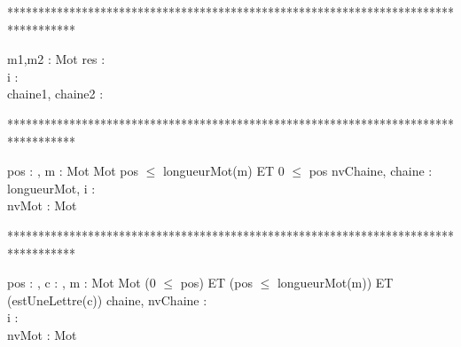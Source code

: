 ***********************************************************************************
\begin{algorithme}
     {m1,m2 : Mot}%
     {\booleen}%
     {res : \booleen \\ i : \entier \\ chaine1, chaine2 : \chaine}%
     {
                  {
                  }%
                  {
                    {
                       {
                       }
                       
                       
                    }
                   }%
      
      }
\end{algorithme}

***********************************************************************************
\begin{algorithme}
       {pos : \naturelNonNul, m : Mot}
       {Mot}
       {pos $\leq$ longueurMot(m) ET 0 $\leq$ pos}
       {nvChaine, chaine : \chaine \\ longueurMot, i : \naturelNonNul\\ nvMot : Mot}
       {
             {
             }
       }
       
\end{algorithme}

***********************************************************************************
\begin{algorithme}
       {pos : \naturelNonNul, c : \caractere, m : Mot}%
       {Mot}%
       {(0 $\leq$ pos) ET (pos $\leq$ longueurMot(m)) ET (estUneLettre(c))}%
       {chaine, nvChaine : \chaine \\ i : \naturelNonNul \\ nvMot : Mot}
       {
            {
            }
            
       }
\end{algorithme}

